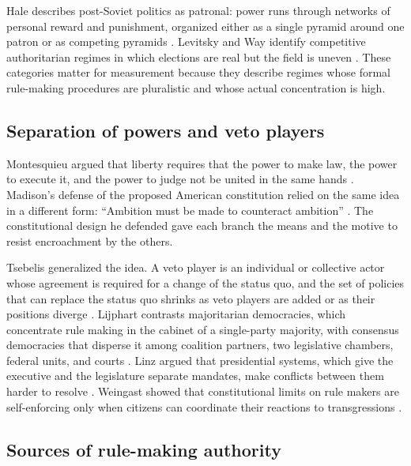 \documentclass[11pt,letterpaper]{article}
\theoremstyle{definition}
\theoremstyle{remark}
\begin{document}
Hale describes post-Soviet politics as patronal: power runs through networks of personal reward and punishment, organized either as a single pyramid around one patron or as competing pyramids \citep{hale2014}. Levitsky and Way identify competitive authoritarian regimes in which elections are real but the field is uneven \citep{levitsky2010}. These categories matter for measurement because they describe regimes whose formal rule-making procedures are pluralistic and whose actual concentration is high.

\subsection{Separation of powers and veto players}

Montesquieu argued that liberty requires that the power to make law, the power to execute it, and the power to judge not be united in the same hands \citep{montesquieu1989}. Madison's defense of the proposed American constitution relied on the same idea in a different form: ``Ambition must be made to counteract ambition'' \citep{madison1788}. The constitutional design he defended gave each branch the means and the motive to resist encroachment by the others.

Tsebelis generalized the idea. A veto player is an individual or collective actor whose agreement is required for a change of the status quo, and the set of policies that can replace the status quo shrinks as veto players are added or as their positions diverge \citep{tsebelis2002}. Lijphart contrasts majoritarian democracies, which concentrate rule making in the cabinet of a single-party majority, with consensus democracies that disperse it among coalition partners, two legislative chambers, federal units, and courts \citep{lijphart1999}. Linz argued that presidential systems, which give the executive and the legislature separate mandates, make conflicts between them harder to resolve \citep{linz1990}. Weingast showed that constitutional limits on rule makers are self-enforcing only when citizens can coordinate their reactions to transgressions \citep{weingast1997}.

\subsection{Sources of rule-making authority}
\end{document}
